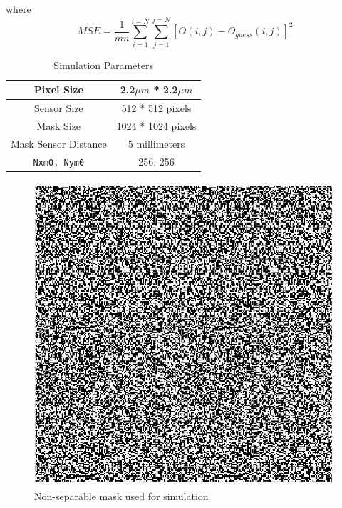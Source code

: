 where 
\begin{equation}
MSE = \frac{1}{mn}\sum_{i=1}^{i=N}\sum_{j=1}^{j=N}[O(i,j) - O_{guess}(i,j)]^2
\end{equation}
\begin{table}
\label{tbl:sim_parameters}
\caption{Simulation Parameters}
\begin{center}
\begin{tabular}{ |c|c| }
\hline
Pixel Size & 2.2$\mu m$ * 2.2$\mu m$\\
\hline
Sensor Size & 512 * 512 pixels\\
\hline     
Mask Size & 1024 * 1024 pixels\\
\hline 
Mask Sensor Distance & 5 millimeters \\
\hline 
\texttt{Nxm0, Nym0} & 256, 256\\
\end{tabular}
\end{center}
\end{table}

\begin{figure}[ht]
\centering
\includegraphics[scale = 0.250]{pics/non_separable_mask}
\caption{Non-separable mask used for simulation}
\label{fig:non_sep_sim}
\end{figure}

